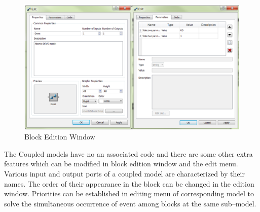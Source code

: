 \documentclass[titlepage]{report}%
\begin{document}
\begin{figure}[ht!]
  \centering
    \includegraphics[width=1\textwidth]{Fig4.png}
    \caption{Block Edition Window}
    \label{Block_win}
\end{figure}

The Coupled models have no an associated code and there are some other extra features which can be modified in block edition window and the edit menu. Various input and output ports of a coupled model are characterized by their names. The order of their appearance in the block can be changed in the edition window. Priorities can be established in editing menu of corresponding model to solve the simultaneous occurrence of event among blocks at the same sub–model.
\end{document}
